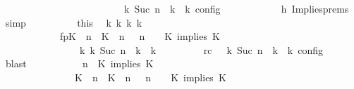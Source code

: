 \begin{isabellebody}
\ \ \ \ \ \ \ \ \ \ \ \ \ \ \ \ \ \ \ \ {\isacharparenright}\ {\isasymand}\ {\isasymrho}\ {\isasymin}\ {\isasymlbrakk}\ {\isasymGamma}\isactrlsub k{\isacharcomma}\ Suc\ n\ {\isasymturnstile}\ {\isasymPsi}\isactrlsub k\ {\isasymtriangleright}\ {\isasymPhi}\isactrlsub k\ {\isasymrbrakk}\isactrlsub c\isactrlsub o\isactrlsub n\isactrlsub f\isactrlsub i\isactrlsub g{\isacartoucheclose}\isanewline
\ \ \ \ \ \ \ \ \ \ \isamarkupfalse%
\ h{}\ Implies{\isachardot}prems\ \isamarkupfalse%
\ simp\isanewline
\ \ \ \ \ \ \ \ \isamarkupfalse%
\ this\ \isamarkupfalse%
\ {\isasymGamma}\isactrlsub k\ {\isasymPsi}\isactrlsub k\ {\isasymPhi}\isactrlsub k\ k\ \isanewline
\ \ \ \ \ \ \ \ \ \ \ \ fp{\isacharcolon}{\isacartoucheopen}{\isacharparenleft}{\isacharparenleft}{\isacharparenleft}K\ {\isasymUp}\ n{\isacharparenright}\ {\isacharhash}\ {\isacharparenleft}K\ {\isasymUp}\ n{\isacharparenright}\ {\isacharhash}\ {\isasymGamma}{\isacharparenright}{\isacharcomma}\ n\ {\isasymturnstile}\ {\isasymPsi}\ {\isasymtriangleright}\ {\isacharparenleft}{\isacharparenleft}K\ implies\ K\ {\isacharhash}\ {\isasymPhi}{\isacharparenright}{\isacharparenright}\isanewline
\ \ \ \ \ \ \ \ \ \ \ \ \ \ \ \ {\isasymhookrightarrow}\isactrlbsup k\isactrlesup \ {\isacharparenleft}{\isasymGamma}\isactrlsub k{\isacharcomma}\ Suc\ n\ {\isasymturnstile}\ {\isasymPsi}\isactrlsub k\ {\isasymtriangleright}\ {\isasymPhi}\isactrlsub k{\isacharparenright}{\isacartoucheclose}\isanewline
\ \ \ \ \ \ \ \ \ rc{\isacharcolon}{\isacartoucheopen}{\isasymrho}\ {\isasymin}\ {\isasymlbrakk}\ {\isasymGamma}\isactrlsub k{\isacharcomma}\ Suc\ n\ {\isasymturnstile}\ {\isasymPsi}\isactrlsub k\ {\isasymtriangleright}\ {\isasymPhi}\isactrlsub k\ {\isasymrbrakk}\isactrlsub c\isactrlsub o\isactrlsub n\isactrlsub f\isactrlsub i\isactrlsub g{\isacartoucheclose}\ \isamarkupfalse%
\ blast\isanewline
\ \ \ \ \ \ \ \ \isamarkupfalse%
\ {\isacartoucheopen}{\isacharparenleft}{\isasymGamma}{\isacharcomma}\ n\ {\isasymturnstile}\ {\isacharparenleft}{\isacharparenleft}K\ implies\ K\ {\isacharhash}\ {\isasymPsi}{\isacharparenright}\ {\isasymtriangleright}\ {\isasymPhi}{\isacharparenright}\isanewline
\ \ \ \ \ \ \ \ \ \ \ \ \ \ {\isasymhookrightarrow}\ {\isacharparenleft}{\isacharparenleft}{\isacharparenleft}K\ {\isasymUp}\ n{\isacharparenright}\ {\isacharhash}\ {\isacharparenleft}K\ {\isasymUp}\ n{\isacharparenright}\ {\isacharhash}\ {\isasymGamma}{\isacharparenright}{\isacharcomma}\ n\ {\isasymturnstile}\ {\isasymPsi}\ {\isasymtriangleright}\ {\isacharparenleft}{\isacharparenleft}K\ implies\ K\ {\isacharhash}\ {\isasymPhi}{\isacharparenright}{\isacharparenright}{\isacartoucheclose}\isanewline

\end{isabellebody}
